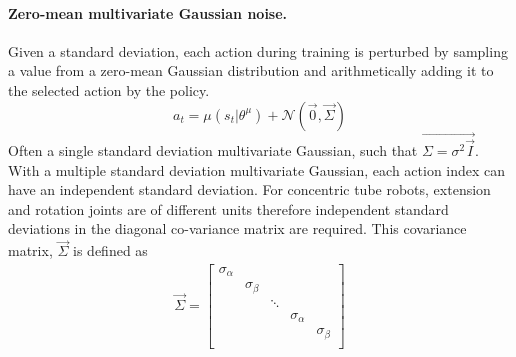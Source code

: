 \paragraph{Zero-mean multivariate Gaussian noise.}
Given a standard deviation, each action during training is perturbed by sampling a value from a zero-mean Gaussian distribution and arithmetically adding it to the selected action by the policy.
\begin{equation}
    a_t = \mu(s_t | \theta^\mu) + \mathcal{N} (\Vec{0}, \Vec{\Sigma})
\end{equation}
Often a single standard deviation multivariate Gaussian, such that $\Vec{\Sigma = \sigma^2 \Vec{I}}$.  With a multiple standard deviation multivariate Gaussian, each action index can have an independent standard deviation. For concentric tube robots, extension and rotation joints are of different units therefore independent standard deviations in the diagonal co-variance matrix are required. This covariance matrix, $\Vec{\Sigma}$ is defined as
\begin{equation}\label{covariance-matrix}
\begin{aligned}
\Vec{\Sigma} =
\left [
\begin{matrix}
\sigma_{\alpha} & & & \\
& \sigma_{\beta} & & \\
& & \ddots & \\
& & & \sigma_{\alpha} &\\
& & & & \sigma_{\beta}\\
\end{matrix}
\right ]
\end{aligned}
\end{equation}

